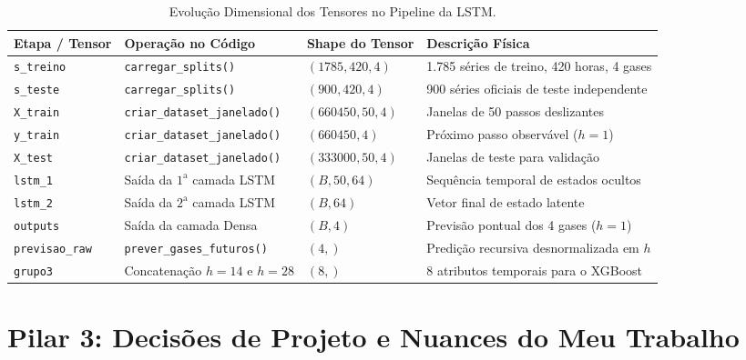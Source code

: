 \documentclass[11pt,a4paper]{article}
\begin{document}
\begin{table}[htbp]
  \centering\small
  \caption{Evolução Dimensional dos Tensores no Pipeline da LSTM.}
  \label{tab:shapes_lstm}
  \begin{tabularx}{\textwidth}{l p{4.5cm} l X}
    \toprule
    \textbf{Etapa / Tensor} & \textbf{Operação no Código} & \textbf{Shape do Tensor} & \textbf{Descrição Física} \\
    \midrule
    \texttt{s\_treino} & \texttt{carregar\_splits()} & $(1785, 420, 4)$ & 1.785 séries de treino, 420 horas, 4 gases \\
    \texttt{s\_teste} & \texttt{carregar\_splits()} & $(900, 420, 4)$ & 900 séries oficiais de teste independente \\
    \texttt{X\_train} & \texttt{criar\_dataset\_janelado()} & $(660450, 50, 4)$ & Janelas de 50 passos deslizantes \\
    \texttt{y\_train} & \texttt{criar\_dataset\_janelado()} & $(660450, 4)$ & Próximo passo observável ($h=1$) \\
    \texttt{X\_test} & \texttt{criar\_dataset\_janelado()} & $(333000, 50, 4)$ & Janelas de teste para validação \\
    \texttt{lstm\_1} & Saída da $1^{\text{a}}$ camada LSTM & $(B, 50, 64)$ & Sequência temporal de estados ocultos \\
    \texttt{lstm\_2} & Saída da $2^{\text{a}}$ camada LSTM & $(B, 64)$ & Vetor final de estado latente \\
    \texttt{outputs} & Saída da camada Densa & $(B, 4)$ & Previsão pontual dos 4 gases ($h=1$) \\
    \texttt{previsao\_raw} & \texttt{prever\_gases\_futuros()} & $(4,)$ & Predição recursiva desnormalizada em $h$ \\
    \texttt{grupo3} & Concatenação $h=14$ e $h=28$ & $(8,)$ & 8 atributos temporais para o XGBoost \\
    \bottomrule
  \end{tabularx}
\end{table}

\vspace{0.4cm}
\section{Pilar 3: Decisões de Projeto e Nuances do Meu Trabalho}
\end{document}
